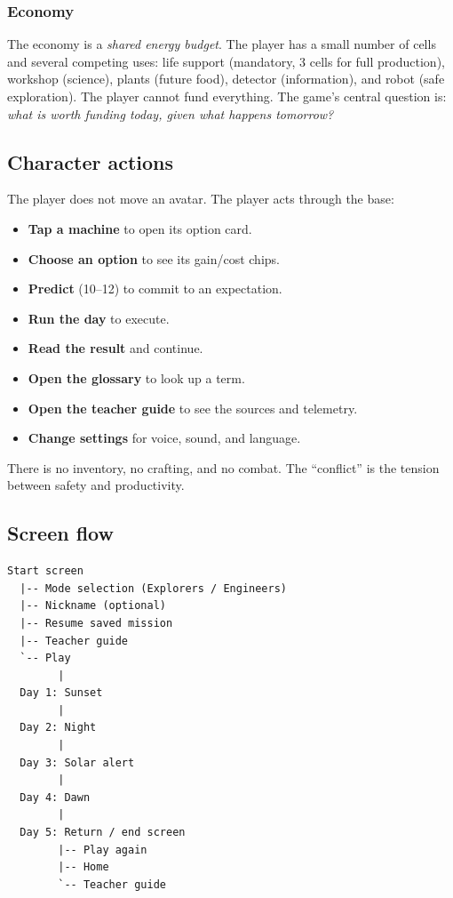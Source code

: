 \documentclass[11pt,a4paper]{article}
\begin{document}
\subsubsection*{Economy}

The economy is a \emph{shared energy budget}. The player has a small number of cells and several competing uses: life support (mandatory, 3 cells for full production), workshop (science), plants (future food), detector (information), and robot (safe exploration). The player cannot fund everything. The game's central question is: \emph{what is worth funding today, given what happens tomorrow?}

\subsection{Character actions}

The player does not move an avatar. The player acts through the base:

\begin{itemize}
  \item \textbf{Tap a machine} to open its option card.
  \item \textbf{Choose an option} to see its gain/cost chips.
  \item \textbf{Predict} (10--12) to commit to an expectation.
  \item \textbf{Run the day} to execute.
  \item \textbf{Read the result} and continue.
  \item \textbf{Open the glossary} to look up a term.
  \item \textbf{Open the teacher guide} to see the sources and telemetry.
  \item \textbf{Change settings} for voice, sound, and language.
\end{itemize}

There is no inventory, no crafting, and no combat. The ``conflict'' is the tension between safety and productivity.

\subsection{Screen flow}

\begin{verbatim}
Start screen
  |-- Mode selection (Explorers / Engineers)
  |-- Nickname (optional)
  |-- Resume saved mission
  |-- Teacher guide
  `-- Play
        |
  Day 1: Sunset
        |
  Day 2: Night
        |
  Day 3: Solar alert
        |
  Day 4: Dawn
        |
  Day 5: Return / end screen
        |-- Play again
        |-- Home
        `-- Teacher guide
\end{verbatim}
\end{document}
